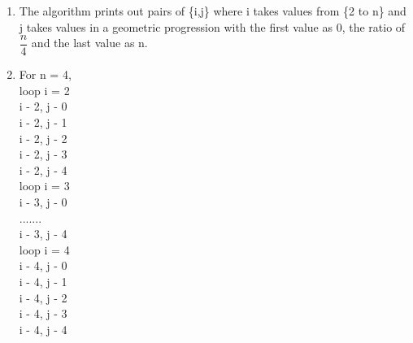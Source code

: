 \documentclass[addpoints,11pt]{exam}
\begin{document}
\begin{questions}
\begin{solutionorbox}
	\begin{enumerate}[label=(\roman*)]
		\item The algorithm prints out pairs of \{i,j\} where i takes values from \{2 to n\} and j takes values in a geometric progression with the first value as 0, the ratio of $\dfrac{n}{4}$ and the last value as n.
		\item \begin{minipage}[b]{0.30\textwidth}
			\raggedright
			For  n = 4,\\
			loop i = 2\\
			i - 2, j - 0\\
			i - 2, j - 1\\
			i - 2, j - 2\\
			i - 2, j - 3\\
			i - 2, j - 4\\
			loop i = 3\\
			i - 3, j - 0\\
			....... \\
			i - 3, j - 4\\
			loop i = 4\\
			i - 4, j - 0\\
			i - 4, j - 1\\
			i - 4, j - 2\\
			i - 4, j - 3\\
			i - 4, j - 4\\ 
			

\end{minipage}
\end{enumerate}
\end{solutionorbox}
\end{questions}
\end{document}
